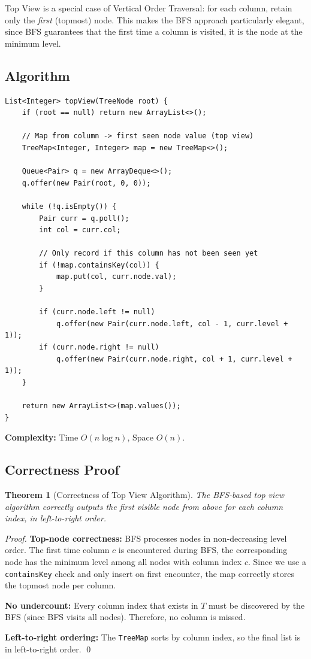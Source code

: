 \documentclass[10pt,journal,compsoc,onecolumn]{IEEEtran}
\newtheorem{theorem}{Theorem}
\begin{document}
Top View is a special case of Vertical Order Traversal: for each column, retain only the \emph{first} (topmost) node. This makes the BFS approach particularly elegant, since BFS guarantees that the first time a column is visited, it is the node at the minimum level.

\subsection{Algorithm}

\begin{verbatim}
List<Integer> topView(TreeNode root) {
    if (root == null) return new ArrayList<>();

    // Map from column -> first seen node value (top view)
    TreeMap<Integer, Integer> map = new TreeMap<>();

    Queue<Pair> q = new ArrayDeque<>();
    q.offer(new Pair(root, 0, 0));

    while (!q.isEmpty()) {
        Pair curr = q.poll();
        int col = curr.col;

        // Only record if this column has not been seen yet
        if (!map.containsKey(col)) {
            map.put(col, curr.node.val);
        }

        if (curr.node.left != null)
            q.offer(new Pair(curr.node.left, col - 1, curr.level + 1));
        if (curr.node.right != null)
            q.offer(new Pair(curr.node.right, col + 1, curr.level + 1));
    }

    return new ArrayList<>(map.values());
}
\end{verbatim}

\textbf{Complexity:} Time $O(n \log n)$, Space $O(n)$.

\subsection{Correctness Proof}

\begin{theorem}[Correctness of Top View Algorithm]
The BFS-based top view algorithm correctly outputs the first visible node from above for each column index, in left-to-right order.
\end{theorem}

\begin{proof}
\textbf{Top-node correctness:} BFS processes nodes in non-decreasing level order. The first time column $c$ is encountered during BFS, the corresponding node has the minimum level among all nodes with column index $c$. Since we use a \texttt{containsKey} check and only insert on first encounter, the map correctly stores the topmost node per column.

\textbf{No undercount:} Every column index that exists in $T$ must be discovered by the BFS (since BFS visits all nodes). Therefore, no column is missed.

\textbf{Left-to-right ordering:} The \texttt{TreeMap} sorts by column index, so the final list is in left-to-right order. \qed
\end{proof}
\end{document}
